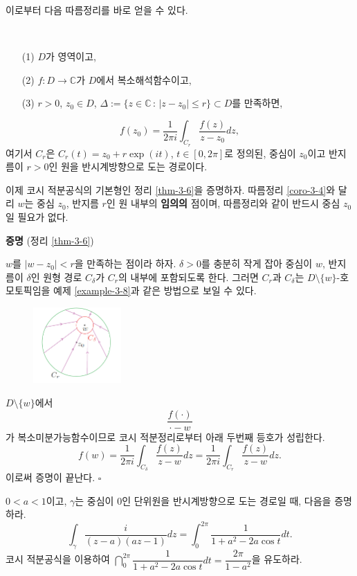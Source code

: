 이로부터 다음 따름정리를 바로 얻을 수 있다.

\begin{salt_corollary} \label{coro-3-4}
\
\begin{itemize}
\item[(1)] $D$가 영역이고, 
\item[(2)] $f:D\to\mathbb C$가 $D$에서 복소해석함수이고,
\item[(3)] $r>0$, $z_0\in D$, 
$\Delta := \{ z\in \mathbb C\,:\, |z-z_0| \le r\} \subset D$를 만족하면,
\end{itemize}
\[
f(z_0) = \dfrac1{2\pi i} \int_{C_r} \dfrac{f(z)}{z-z_0} dz,
\]
여기서 $C_r$은 $C_r(t) = z_0 + r\exp(it)$, $t\in [0,2\pi]$로 
정의된, 중심이 $z_0$이고 반지름이 $r>0$인 
원을 반시계방향으로 도는 경로이다.
\end{salt_corollary}

이제 코시 적분공식의 기본형인 정리 \ref{thm-3-6}을 증명하자.
따름정리 \ref{coro-3-4}와 달리
$w$는 중심 $z_0$, 반지름 $r$인 원 내부의 {\bf 임의의} 점이며,
따름정리와 같이 반드시 중심 $z_0$일 필요가 없다.

{\bf 증명} (정리 \ref{thm-3-6})

$w$를 $|w-z_0| <r$을 만족하는 점이라 하자.
$\delta>0$를 충분히 작게 잡아 
중심이 $w$, 반지름이 $\delta$인 원형 경로 $C_\delta$가 $C_r$의 내부에 포함되도록 한다.
그러면 $C_r$과 $C_\delta$는 $D\setminus\{w\}$-호모토픽임을
예제 \ref{example-3-8}과 같은 방법으로 보일 수 있다.

\begin{figure}[h!]
\begin{center}
\includegraphics[width=0.3\textwidth]{./SaltChapter/fig-3-0-9}
\end{center}
\end{figure}
$D\setminus\{w\}$에서
\[
\dfrac{f(\cdot)}{\cdot - w}
\]
가 복소미분가능함수이므로 코시 적분정리로부터 아래 두번째 등호가 성립한다.
\[
f(w) = \dfrac 1{2\pi i} \int_{C_\delta} \dfrac{f(z)}{z-w}dz
= \dfrac 1{2\pi i} \int_{C_r} \dfrac{f(z)}{z-w}dz.
\]
이로써 증명이 끝난다. \hfill $\square$

\begin{salt_exercise} \label{ex-3-24}
$0<a<1$이고, $\gamma$는 중심이 $0$인 단위원을 반시계방향으로 도는 경로일 때,
다음을 증명하라.
\[
\int_\gamma \dfrac{i}{(z-a)(az-1)}dz = \int_0^{2\pi} \dfrac 1{1+a^2-2a\cos t}dt.
\]
코시 적분공식을 이용하여 
$\dint_0^{2\pi} \dfrac 1{1+a^2-2a\cos t}dt = \dfrac{2\pi}{1-a^2}$을 유도하라.
\end{salt_exercise}

